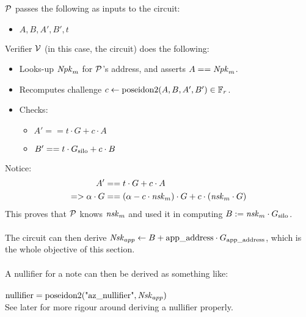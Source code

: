 \noindent
$\P$ passes the following as inputs to the circuit:

\begin{itemize}
    \item $A, B, A', B', t$
\end{itemize}

\noindent
Verifier $\V$ (in this case, the circuit) does the following:

\begin{itemize}
    \item Looks-up $\Npkm$ for $\P$'s address, and asserts $A == \Npkm$.
    \item Recomputes challenge $c \leftarrow \poseidon(A, B, A', B') \in \Fr$.
    \item Checks:
    \begin{itemize}
        \item $A' == t \cdot G + c \cdot A$ 
        \item $B' == t \cdot \Gsilo + c \cdot B$ 
    \end{itemize}
\end{itemize}
\noindent
Notice:
\begin{align*}
    A' &== t \cdot G + c \cdot A\\
    => \alpha \cdot G &== (\alpha - c \cdot \nskm) \cdot G + c \cdot (\nskm \cdot G)
\end{align*}
\noindent
This proves that $\P$ knows $\nskm$ and used it in computing $B := \nskm \cdot \Gsilo$.\\
\\
The circuit can then derive $\Nskapp \leftarrow B + \appaddress \cdot \Gappaddress$, which is the whole objective of this section.\\
\\
A nullifier for a note can then be derived as something like:\\
\\
$\text{nullifier} = \poseidon(\text{"az\_nullifier"}, \Nskapp)$
\\
See later for more rigour around deriving a nullifier properly.\\
\\




